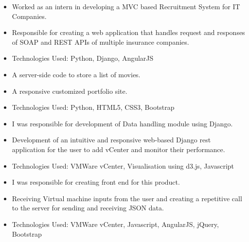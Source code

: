 \documentclass[10pt,a4paper]{altacv}
\begin{document}
\divider


\begin{itemize}
\item Worked as an intern in developing a MVC based Recruitment System for IT Companies.
\end{itemize}






\begin{itemize}
\item Responsible for creating a web application that handles request and responses of SOAP and REST APIs of multiple insurance companies.
\item Technologies Used: Python, Django, AngularJS
\end{itemize}

\divider

\begin{itemize}
\item A server-side code to store a list of movies. 
\item A responsive customized portfolio site.
\item Technologies Used: Python, HTML5, CSS3, Bootstrap
\end{itemize}

\divider

\begin{itemize}
\item I was responsible for development of Data handling module using Django.
\item Development of an intuitive and responsive web-based Django
rest application for the user to add vCenter and monitor their
performance.
\item Technologies Used: VMWare vCenter, Visualisation using d3.js, Javascript 
\end{itemize}


\divider

\begin{itemize}
\item I was responsible for creating front end for this product.
\item Receiving Virtual machine inputs from the user and creating a repetitive call to the server for sending and receiving JSON data.
\item Technologies Used: VMWare vCenter, Javascript, AngularJS, jQuery, Bootstrap
\end{itemize}
\end{document}
